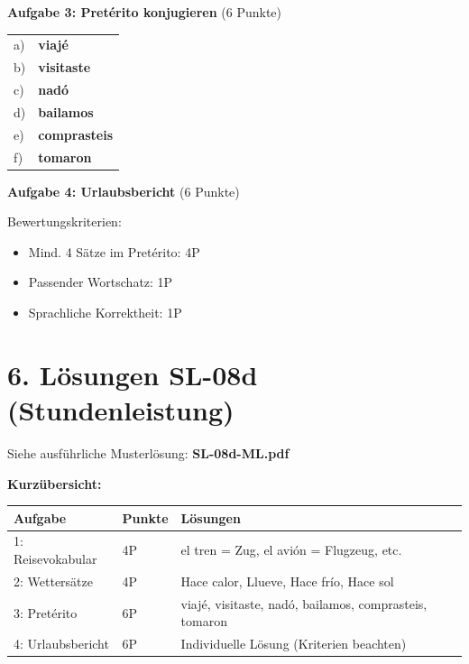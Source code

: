 \documentclass[11pt, a4paper]{article}
\newcommand{\loesung}[1]{\textcolor{loesung}{\textbf{#1}}}
\begin{document}
\vspace{1em}

\textbf{Aufgabe 3: Pretérito konjugieren} (6 Punkte)

\begin{tabular}{ll}
a) & \loesung{viajé} \\
b) & \loesung{visitaste} \\
c) & \loesung{nadó} \\
d) & \loesung{bailamos} \\
e) & \loesung{comprasteis} \\
f) & \loesung{tomaron} \\
\end{tabular}

\vspace{1em}

\textbf{Aufgabe 4: Urlaubsbericht} (6 Punkte)

Bewertungskriterien:
\begin{itemize}
    \item Mind. 4 Sätze im Pretérito: 4P
    \item Passender Wortschatz: 1P
    \item Sprachliche Korrektheit: 1P
\end{itemize}


\section*{6. Lösungen SL-08d (Stundenleistung)}

Siehe ausführliche Musterlösung: \textbf{SL-08d-ML.pdf}

\textbf{Kurzübersicht:}

\begin{tabular}{|l|l|l|}
\hline
\textbf{Aufgabe} & \textbf{Punkte} & \textbf{Lösungen} \\
\hline
1: Reisevokabular & 4P & el tren = Zug, el avión = Flugzeug, etc. \\
\hline
2: Wettersätze & 4P & Hace calor, Llueve, Hace frío, Hace sol \\
\hline
3: Pretérito & 6P & viajé, visitaste, nadó, bailamos, comprasteis, tomaron \\
\hline
4: Urlaubsbericht & 6P & Individuelle Lösung (Kriterien beachten) \\
\hline
\end{tabular}
\end{document}
